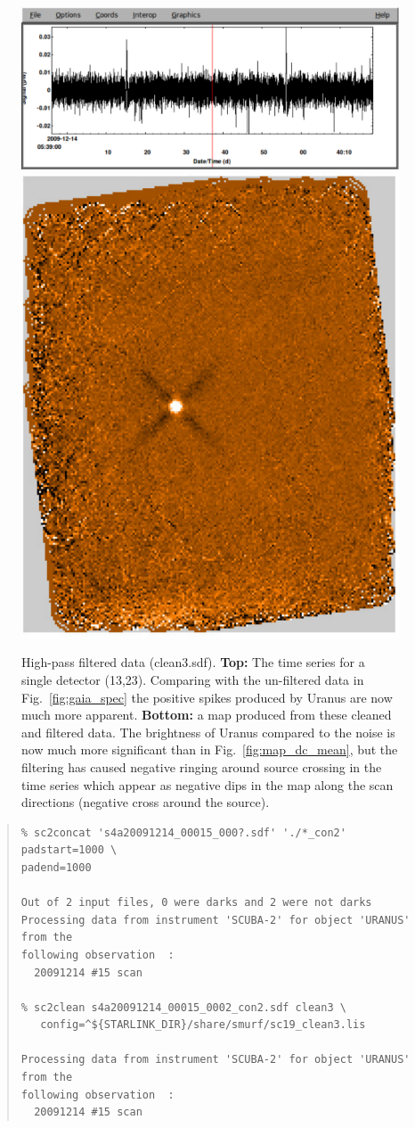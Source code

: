 \documentclass[twoside,11pt]{article}
\renewcommand{\_}{\texttt{\symbol{95}}}
\newenvironment{myquote}{\begin{quote}\begin{small}}{\end{small}\end{quote}}
\begin{document}
\begin{figure}
\begin{center}
\includegraphics[width=\linewidth]{sc19_spec_filt} \\
\vspace{0.3in}
\includegraphics[width=0.5\linewidth]{sc19_map_highpass}
\caption{High-pass filtered data (clean3.sdf). {\bf Top:} The time
  series for a single detector (13,23). Comparing with the un-filtered
  data in Fig.~\ref{fig:gaia_spec} the positive spikes produced by
  Uranus are now much more apparent. {\bf Bottom:} a map produced from
  these cleaned and filtered data. The brightness of Uranus compared
  to the noise is now much more significant than in
  Fig.~\ref{fig:map_dc_mean}, but the filtering has caused negative
  ringing around source crossing in the time series which appear as
  negative dips in the map along the scan directions (negative cross
  around the source).}
\label{fig:highpass}
\end{center}
\end{figure}

\begin{myquote}
\begin{verbatim}
% sc2concat 's4a20091214_00015_000?.sdf' './*_con2' padstart=1000 \
padend=1000

Out of 2 input files, 0 were darks and 2 were not darks
Processing data from instrument 'SCUBA-2' for object 'URANUS' from the
following observation  :
  20091214 #15 scan

% sc2clean s4a20091214_00015_0002_con2.sdf clean3 \
   config=^${STARLINK_DIR}/share/smurf/sc19_clean3.lis

Processing data from instrument 'SCUBA-2' for object 'URANUS' from the
following observation  :
  20091214 #15 scan

\end{verbatim}
\end{myquote}
\end{document}
